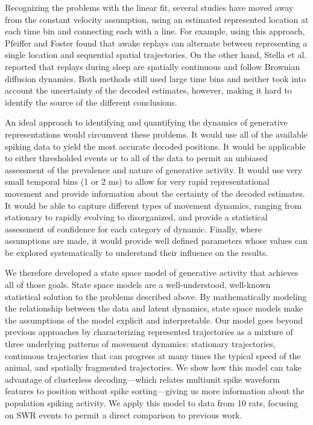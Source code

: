 \documentclass[times, twoside]{zHenriquesLab-StyleBioRxiv}
\begin{document}
Recognizing the problems with the linear fit, several studies have moved away from the constant velocity assumption, using an estimated represented location at each time bin and connecting each with a line. For example, using this approach, Pfeiffer and Foster \cite{PfeifferAutoassociativedynamicsgeneration2015} found that awake replays can alternate between representing a single location and sequential spatial trajectories. On the other hand, Stella et al. \cite{StellaHippocampalReactivationRandom2019} reported that replays during sleep are spatially continuous and follow Brownian diffusion dynamics. Both methods still used large time bins and neither took into account the uncertainty of the decoded estimates, however, making it hard to identify the source of the different conclusions.

An ideal approach to identifying and quantifying the dynamics of generative representations would circumvent these problems. It would use all of the available spiking data to yield the most accurate decoded positions. It would be applicable to either thresholded events or to all of the data to permit an unbiased assessment of the prevalence and nature of generative activity. It would use very small temporal bins (1 or 2 ms) to allow for very rapid representational movement and provide information about the certainty of the decoded estimates. It would be able to capture different types of movement dynamics, ranging from stationary to rapidly evolving to disorganized, and provide a statistical assessment of confidence for each category of dynamic. Finally, where assumptions are made, it would provide well defined parameters whose values can be explored systematically to understand their influence on the results.

We therefore developed a state space model of generative activity that achieves all of those goals. State space models are a well-understood, well-known statistical solution to the problems described above. By mathematically modeling the relationship between the data and latent dynamics, state space models make the assumptions of the model explicit and interpretable. Our model goes beyond previous approaches \cite{MaboudiUncoveringtemporalstructure2018, DengRapidclassificationhippocampal2016} by characterizing represented trajectories as a mixture of three underlying patterns of movement dynamics: stationary trajectories, continuous trajectories that can progress at many times the typical speed of the animal, and spatially fragmented trajectories. We show how this model can take advantage of clusterless decoding---which relates multiunit spike waveform features to position without spike sorting---giving us more information about the population spiking activity. We apply this model to data from 10 rats, focusing on SWR events to permit a direct comparison to previous work. 
\end{document}
